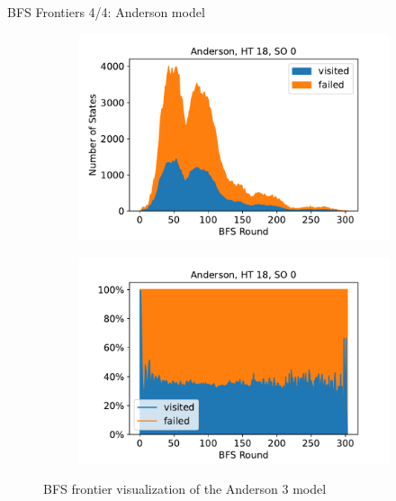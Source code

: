 \documentclass[aspectratio=169]{beamer}
\begin{document}
{\begin{frame}{BFS Frontiers 4/4: Anderson model}
    \begin{figure}
        \begin{subfigure}[b]{.49\textwidth}
            \centering
            \includegraphics[width=\textwidth]{../../evaluation/output-assets/EXP-11-bfs-frontiers-3.pdf}
            \label{fig:evaluation:EXP-11:3}
        \end{subfigure}
        \begin{subfigure}[b]{.49\textwidth}
            \centering
            \includegraphics[width=\textwidth]{../../evaluation/output-assets/EXP-11-bfs-frontiers-7.pdf}
            \label{fig:evaluation:EXP-11:7}
        \end{subfigure}
        \caption{BFS frontier visualization of the Anderson 3 model}
        \label{fig:evaluation:EXP-11-3}
    \end{figure}
\end{frame}
}
\end{document}
